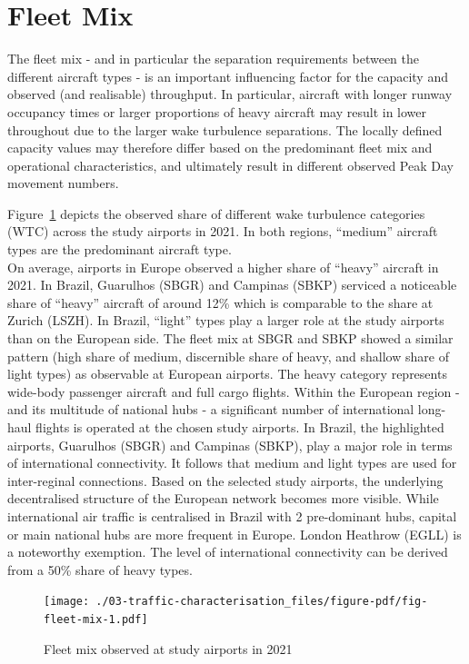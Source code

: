 \documentclass[
  a4paper,
  DIV=11,
  numbers=noendperiod]{scrreprt}
\begin{document}
\hypertarget{fleet-mix}{%
\section{Fleet Mix}\label{fleet-mix}}

The fleet mix - and in particular the separation requirements between
the different aircraft types - is an important influencing factor for
the capacity and observed (and realisable) throughput. In particular,
aircraft with longer runway occupancy times or larger proportions of
heavy aircraft may result in lower throughout due to the larger wake
turbulence separations. The locally defined capacity values may
therefore differ based on the predominant fleet mix and operational
characteristics, and ultimately result in different observed Peak Day
movement numbers.

Figure~\ref{fig-fleet-mix} depicts the observed share of different wake
turbulence categories (WTC) across the study airports in 2021. In both
regions, ``medium'' aircraft types are the predominant aircraft type.\\
On average, airports in Europe observed a higher share of ``heavy''
aircraft in 2021. In Brazil, Guarulhos (SBGR) and Campinas (SBKP)
serviced a noticeable share of ``heavy'' aircraft of around 12\% which
is comparable to the share at Zurich (LSZH). In Brazil, ``light'' types
play a larger role at the study airports than on the European side. The
fleet mix at SBGR and SBKP showed a similar pattern (high share of
medium, discernible share of heavy, and shallow share of light types) as
observable at European airports. The heavy category represents wide-body
passenger aircraft and full cargo flights. Within the European region -
and its multitude of national hubs - a significant number of
international long-haul flights is operated at the chosen study
airports. In Brazil, the highlighted airports, Guarulhos (SBGR) and
Campinas (SBKP), play a major role in terms of international
connectivity. It follows that medium and light types are used for
inter-reginal connections. Based on the selected study airports, the
underlying decentralised structure of the European network becomes more
visible. While international air traffic is centralised in Brazil with 2
pre-dominant hubs, capital or main national hubs are more frequent in
Europe. London Heathrow (EGLL) is a noteworthy exemption. The level of
international connectivity can be derived from a 50\% share of heavy
types.

\begin{figure}[h]

{\centering \texttt{[image: ./03-traffic-characterisation\_files/figure-pdf/fig-fleet-mix-1.pdf]}

}

\caption{\label{fig-fleet-mix}Fleet mix observed at study airports in
2021}

\end{figure}
\end{document}
